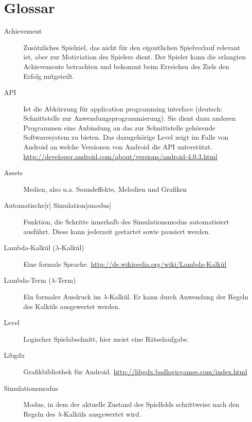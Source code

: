 \section{Glossar}
\begin{description}
	\item[Achievement] Zusätzliches Spielziel, das nicht für den eigentlichen Spielverlauf relevant ist, aber zur Motiviation des Spielers dient.
		Der Spieler kann die erlangten Achievements betrachten und bekommt beim Erreichen des Ziels den Erfolg mitgeteilt.
	\item[API] Ist die Abkürzung für application programming interface (deutsch: Schnittstelle zur Anwendungsprogrammierung). Sie dient dazu anderen Programmen eine Anbindung an das zur Schnittstelle gehörende Softwaresystem zu bieten. Das dazugehörige Level zeigt im Falle von Android an welche Versionen von Android die API unterstützt. \url{http://developer.android.com/about/versions/android-4.0.3.html}
	\item[Assets] Medien, also u.a. Soundeffekte, Melodien und Grafiken
	\item[Automatische{[}r{]} Simulation{[}smodus{]}] Funktion, die Schritte innerhalb des Simulationsmodus automatisiert ausführt. Diese kann jederzeit gestartet sowie pausiert werden.
	\item[Lambda-Kalkül (\(\lambda\)-Kalkül)] Eine formale Sprache. \url{http://de.wikipedia.org/wiki/Lambda-Kalkül}
	\item[Lambda-Term (\(\lambda\)-Term)] Ein formaler Ausdruck im \(\lambda\)-Kalkül.
		Er kann durch Anwendung der Regeln des Kalküls ausgewertet werden.
	\item[Level] Logischer Spielabschnitt, hier meist eine Rätselaufgabe.
	\item[Libgdx] Grafikbibliothek für Android. \url{http://libgdx.badlogicgames.com/index.html}
	\item[Simulationsmodus] Modus, in dem der aktuelle Zustand des Spielfelds schrittweise nach den Regeln des \(\lambda\)-Kalküls ausgewertet wird.
\end{description}
